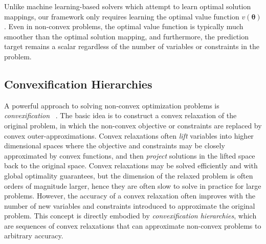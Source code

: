 \documentclass[10pt]{article} %
\theoremstyle{plain}
\theoremstyle{definition}
\theoremstyle{remark}
\begin{document}
Unlike machine learning-based solvers which attempt to learn optimal solution mappings, our framework only requires learning the optimal value function $v(\bm{\theta})$. Even in non-convex problems, the optimal value function is typically much smoother than the optimal solution mapping, and furthermore, the prediction target remains a scalar regardless of the number of variables or constraints in the problem.

\subsection*{Convexification Hierarchies}


A powerful approach to solving non-convex optimization problems is \textit{convexification} ~\citep{zhang2018conic}. The basic idea is to construct a convex relaxation of the original problem, in which the non-convex objective or constraints are replaced by convex outer-approximations.
Convex relaxations often \textit{lift} variables into higher dimensional spaces where the objective and constraints may be closely approximated by convex functions, and then \textit{project} solutions in the lifted space back to the original space.
Convex relaxations may be solved efficiently and with global optimality guarantees, but the dimension of the relaxed problem is often orders of magnitude larger, hence they are often slow to solve in practice for large problems.
However, the accuracy of a convex relaxation often improves with the number of new variables and constraints introduced to approximate the original problem.
This concept is directly embodied by \textit{convexification hierarchies}, which are sequences of convex relaxations that can approximate non-convex problems to arbitrary accuracy.
\end{document}
